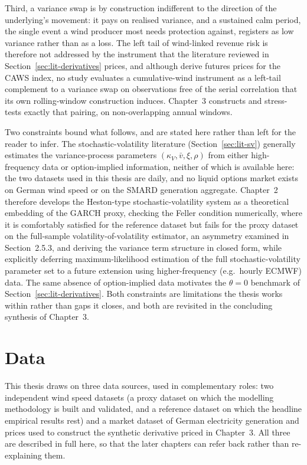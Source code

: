 ﻿\documentclass[11pt, a4paper, twoside]{article}
\begin{document}
Third, a variance swap is by construction indifferent to the direction of the underlying's movement: it pays on realised variance, and a sustained calm period, the single event a wind producer most needs protection against, registers as low variance rather than as a loss. The left tail of wind-linked revenue risk is therefore not addressed by the instrument that the literature reviewed in Section~\ref{sec:lit-derivatives} prices, and although \citet{AlexandridisZapranis2013} derive futures prices for the CAWS index, no study evaluates a cumulative-wind instrument as a left-tail complement to a variance swap on observations free of the serial correlation that its own rolling-window construction induces. Chapter~3 constructs and stress-tests exactly that pairing, on non-overlapping annual windows.

Two constraints bound what follows, and are stated here rather than left for the reader to infer. The stochastic-volatility literature (Section~\ref{sec:lit-sv}) generally estimates the variance-process parameters $(\kappa_V, \bar v, \xi, \rho)$ from either high-frequency data or option-implied information, neither of which is available here: the two datasets used in this thesis are daily, and no liquid options market exists on German wind speed or on the SMARD generation aggregate. Chapter~2 therefore develops the Heston-type stochastic-volatility system as a theoretical embedding of the GARCH proxy, checking the Feller condition numerically, where it is comfortably satisfied for the reference dataset but fails for the proxy dataset on the full-sample volatility-of-volatility estimator, an asymmetry examined in Section~2.5.3, and deriving the variance term structure in closed form, while explicitly deferring maximum-likelihood estimation of the full stochastic-volatility parameter set to a future extension using higher-frequency (e.g.\ hourly ECMWF) data. The same absence of option-implied data motivates the $\theta = 0$ benchmark of Section~\ref{sec:lit-derivatives}. Both constraints are limitations the thesis works within rather than gaps it closes, and both are revisited in the concluding synthesis of Chapter~3.

\section{Data}
\label{sec:data}

This thesis draws on three data sources, used in complementary roles: two independent wind speed datasets (a proxy dataset on which the modelling methodology is built and validated, and a reference dataset on which the headline empirical results rest) and a market dataset of German electricity generation and prices used to construct the synthetic derivative priced in Chapter~3. All three are described in full here, so that the later chapters can refer back rather than re-explaining them.
\end{document}
